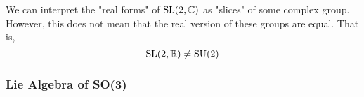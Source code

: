   \begin{center}
  \end{center}
  We can interpret the "real forms" of $\SL(2, \mathbb{C})$ as "slices" of some complex group. However, this does not mean that the real version of these groups are equal. That is, 
  \begin{equation}
    \SL(2, \mathbb{R}) \neq \text{SU}(2)
  \end{equation}

\subsubsection{Lie Algebra of SO(3)}

